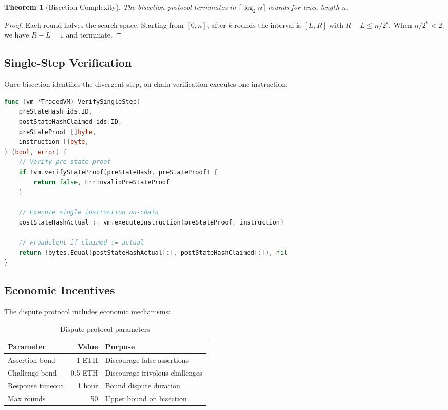 \documentclass[11pt,a4paper]{article}
\newtheorem{theorem}{Theorem}
\begin{document}
\begin{theorem}[Bisection Complexity]
The bisection protocol terminates in $\lceil \log_2 n \rceil$ rounds for trace length $n$.
\end{theorem}

\begin{proof}
Each round halves the search space. Starting from $[0, n]$, after $k$ rounds the interval is $[L, R]$ with $R - L \leq n/2^k$. When $n/2^k < 2$, we have $R - L = 1$ and terminate.
\end{proof}

\subsection{Single-Step Verification}

Once bisection identifies the divergent step, on-chain verification executes one instruction:

\begin{lstlisting}[language=Go, caption=Single-step verification]
func (vm *TracedVM) VerifySingleStep(
    preStateHash ids.ID,
    postStateHashClaimed ids.ID,
    preStateProof []byte,
    instruction []byte,
) (bool, error) {
    // Verify pre-state proof
    if !vm.verifyStateProof(preStateHash, preStateProof) {
        return false, ErrInvalidPreStateProof
    }

    // Execute single instruction on-chain
    postStateHashActual := vm.executeInstruction(preStateProof, instruction)

    // Fraudulent if claimed != actual
    return !bytes.Equal(postStateHashActual[:], postStateHashClaimed[:]), nil
}
\end{lstlisting}

\subsection{Economic Incentives}

The dispute protocol includes economic mechanisms:

\begin{table}[h]
\centering
\begin{tabular}{lrl}
\toprule
\textbf{Parameter} & \textbf{Value} & \textbf{Purpose} \\
\midrule
Assertion bond & 1 ETH & Discourage false assertions \\
Challenge bond & 0.5 ETH & Discourage frivolous challenges \\
Response timeout & 1 hour & Bound dispute duration \\
Max rounds & 50 & Upper bound on bisection \\
\bottomrule
\end{tabular}
\caption{Dispute protocol parameters}
\end{table}
\end{document}
